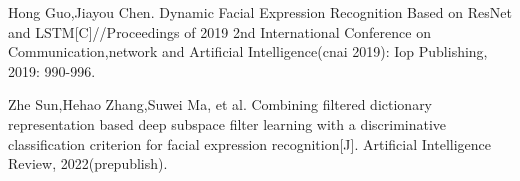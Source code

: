 \documentclass[a0,portrait]{a0poster}
\begin{document}
\begin{multicols}{2}
\begin{thebibliography}{00}
	\label{cite:b1}
		Hong Guo,Jiayou Chen. Dynamic Facial Expression Recognition Based on ResNet and LSTM[C]//Proceedings of 2019 2nd International Conference on Communication,network and Artificial Intelligence(cnai 2019): Iop Publishing, 2019: 990-996.
	
	\label{cite:b2}	
		Zhe Sun,Hehao Zhang,Suwei Ma, et al. Combining filtered dictionary representation based deep subspace filter learning with a discriminative classification criterion for facial expression recognition[J]. Artificial Intelligence Review, 2022(prepublish).
	
\end{thebibliography}


\end{multicols}
\end{document}
